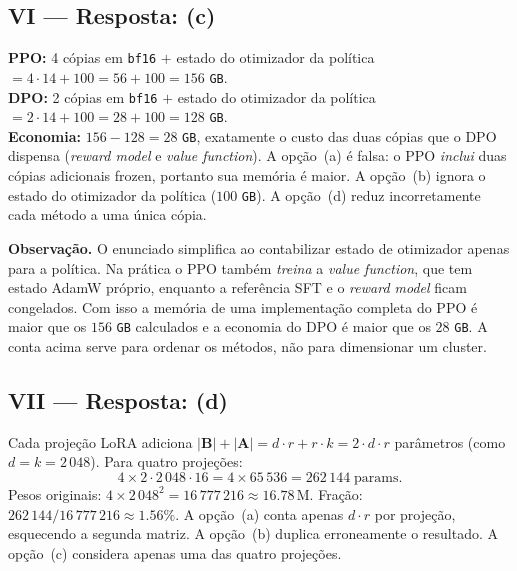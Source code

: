 \documentclass{dlproblemset}
\begin{document}
\subsection*{VI — Resposta: (c)}
\textbf{PPO:} 4 cópias em \texttt{bf16} $+$ estado do otimizador da política
$= 4\cdot 14 + 100 = 56 + 100 = 156$ \texttt{GB}.\\
\textbf{DPO:} 2 cópias em \texttt{bf16} $+$ estado do otimizador da política
$= 2\cdot 14 + 100 = 28 + 100 = 128$ \texttt{GB}.\\
\textbf{Economia:} $156 - 128 = 28$ \texttt{GB}, exatamente o custo das duas
cópias que o DPO dispensa (\textit{reward model} e \textit{value function}).
A opção~(a) é falsa: o PPO \emph{inclui} duas cópias adicionais frozen,
portanto sua memória é maior.
A opção~(b) ignora o estado do otimizador da política ($100$ \texttt{GB}).
A opção~(d) reduz incorretamente cada método a uma única cópia.

\textbf{Observação.} O enunciado simplifica ao contabilizar estado de otimizador
apenas para a política. Na prática o PPO também \emph{treina} a \textit{value
function}, que tem estado AdamW próprio, enquanto a referência SFT e o
\textit{reward model} ficam congelados. Com isso a memória de uma implementação
completa do PPO é maior que os $156$ \texttt{GB} calculados e a economia do DPO é
maior que os $28$ \texttt{GB}. A conta acima serve para ordenar os métodos, não
para dimensionar um cluster.

\subsection*{VII — Resposta: (d)}
Cada projeção LoRA adiciona $|\mathbf{B}| + |\mathbf{A}| = d\cdot r + r\cdot k = 2\cdot d\cdot r$
parâmetros (como $d = k = 2\,048$). Para quatro projeções:
\[
  4 \times 2 \cdot 2\,048 \cdot 16 = 4 \times 65\,536 = 262\,144 \;\text{params}.
\]
Pesos originais: $4 \times 2\,048^2 = 16\,777\,216 \approx 16.78\,$M.
Fração: $262\,144 / 16\,777\,216 \approx 1.56\%$.
A opção~(a) conta apenas $d \cdot r$ por projeção, esquecendo a segunda matriz.
A opção~(b) duplica erroneamente o resultado.
A opção~(c) considera apenas uma das quatro projeções.

\end{document}
